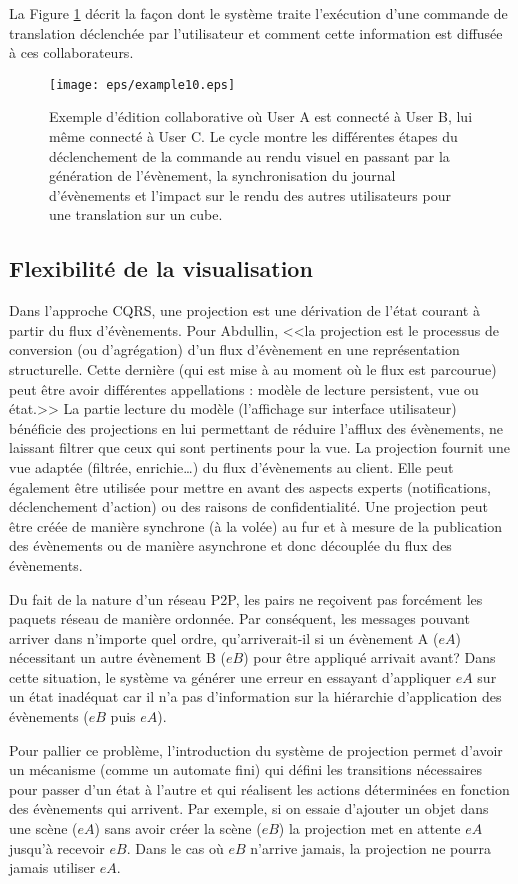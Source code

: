 La Figure \ref{fig:cqrs-example} décrit la façon dont le système traite l'exécution 
d'une commande de translation déclenchée par l'utilisateur et comment cette 
information est diffusée à ces collaborateurs.
\begin{figure}[ht]
	\centering
	\texttt{[image: eps/example10.eps]}
	\caption[Flux de la collaboration dans le framework 3DEvent entre 3 
	utilisateurs]{Exemple d'édition collaborative où User A est connecté à User  B, 
		lui 
		même connecté à User C. Le cycle montre les différentes étapes du 
		déclenchement de la commande au rendu visuel en passant par la 
		génération 
		de l'évènement, la 
		synchronisation du journal d'évènements et l'impact sur le rendu des autres 
		utilisateurs pour une translation sur un cube.}\label{fig:cqrs-example}
\end{figure}
\subsection{Flexibilité de la visualisation}
\label{sec:flexviz}
Dans l'approche \gls{CQRS}, une projection est une dérivation de l'état courant à 
partir du flux d'évènements. Pour Abdullin, <<la projection est le processus de 
conversion (ou d'agrégation) d'un flux d'évènement en une représentation 
structurelle. Cette dernière (qui est mise à au moment où le flux est parcourue) 
peut être avoir différentes appellations : modèle de lecture persistent, vue ou 
état.>>
La partie lecture du modèle (l'affichage sur interface utilisateur) bénéficie des 
projections en lui permettant de réduire l'afflux des évènements, ne laissant filtrer 
que ceux qui sont pertinents pour la vue. La projection fournit une vue adaptée 
(filtrée, enrichie\ldots) du flux d'évènements au client. Elle peut également être 
utilisée pour mettre en avant des aspects experts (notifications, déclenchement 
d'action) ou des raisons de confidentialité.
Une projection peut être créée de manière synchrone (à la volée) au fur et à 
mesure de la publication des évènements ou de manière asynchrone et donc 
découplée du flux des évènements. 


Du fait de la nature d'un réseau \gls{P2P}, les pairs ne reçoivent pas forcément les 
paquets réseau de manière ordonnée.
Par conséquent, les messages pouvant arriver dans n'importe quel ordre, 
qu'arriverait-il si un évènement A ($eA$) nécessitant un autre évènement B ($eB$) 
pour être appliqué arrivait avant? Dans cette situation, le système va générer une 
erreur en essayant d'appliquer $eA$ sur un état inadéquat car il n'a pas 
d'information sur la hiérarchie d'application des évènements ($eB$ puis $eA$).

Pour pallier ce problème, l'introduction du système de projection permet d'avoir un 
mécanisme (comme un automate fini) qui défini les transitions nécessaires pour 
passer d'un état à l'autre et qui réalisent les actions déterminées en fonction des 
évènements qui arrivent. Par exemple, si on essaie d'ajouter un objet dans une 
scène  ($eA$) sans avoir créer la scène ($eB$) la projection met en attente $eA$ 
jusqu'à recevoir $eB$. Dans le cas où $eB$ n'arrive jamais, la projection ne pourra 
jamais utiliser $eA$.


